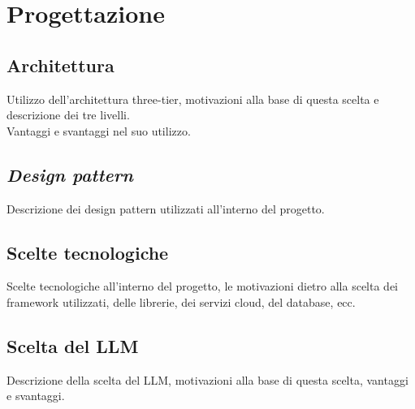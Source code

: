\section{Progettazione}
\label{sez:progettazione}

\subsection{Architettura}
\label{subsec:architettura}

Utilizzo dell'architettura three-tier, motivazioni alla base di questa scelta e descrizione dei tre livelli. \\
Vantaggi e svantaggi nel suo utilizzo.

\subsection{\textit{Design pattern}}
\label{subsec:design-pattern}

Descrizione dei design pattern utilizzati all'interno del progetto.

\subsection{Scelte tecnologiche}
\label{subsec:scelte-tecnologiche}

Scelte tecnologiche all'interno del progetto, le motivazioni dietro alla scelta dei framework utilizzati, delle librerie, dei servizi cloud, del database, ecc.

\subsection{Scelta del LLM}
\label{subsec:scelta-llm}

Descrizione della scelta del LLM, motivazioni alla base di questa scelta, vantaggi e svantaggi.